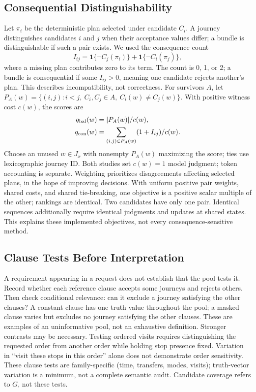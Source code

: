 \documentclass[a4paper,twoside]{article}
\begin{document}
\subsection{Consequential Distinguishability}

Let $\pi_i$ be the deterministic plan selected under candidate $C_i$. A journey distinguishes candidates $i$ and $j$ when their acceptance values differ; a bundle is distinguishable if such a pair exists. We used the consequence count
\begin{equation}
 I_{ij}=\mathbf{1}\{\neg C_j(\pi_i)\}
       +\mathbf{1}\{\neg C_i(\pi_j)\},
\end{equation}
where a missing plan contributes zero to its term. The count is 0, 1, or 2; a bundle is consequential if some $I_{ij}>0$, meaning one candidate rejects another's plan. This describes incompatibility, not correctness.
For survivors $A$, let $P_A(w)=\{(i,j):i<j,\ C_i,C_j\in A,\ C_i(w)\ne C_j(w)\}$. With positive witness cost $c(w)$, the scores are
\begin{equation}
\begin{split}
q_{\rm bal}(w)&=|P_A(w)|/c(w),\\
q_{\rm con}(w)&=\sum_{(i,j)\in P_A(w)}(1+I_{ij})/c(w).
\end{split}
\end{equation}
Choose an unused $w\in J_x$ with nonempty $P_A(w)$ maximizing the score; ties use lexicographic journey ID. Both studies set $c(w)=1$ model judgment; token accounting is separate. Weighting prioritizes disagreements affecting selected plans, in the hope of improving decisions. With uniform positive pair weights, shared costs, and shared tie-breaking, one objective is a positive scalar multiple of the other; rankings are identical. Two candidates have only one pair. Identical sequences additionally require identical judgments and updates at shared states. This explains these implemented objectives, not every consequence-sensitive method.



\subsection{Clause Tests Before Interpretation}

A requirement appearing in a request does not establish that the pool tests it. Record whether each reference clause accepts some journeys and rejects others. Then check conditional relevance: can it exclude a journey satisfying the other clauses? A constant clause has one truth value throughout the pool; a masked clause varies but excludes no journey satisfying the other clauses. These are examples of an uninformative pool, not an exhaustive definition.
Stronger contrasts may be necessary. Testing ordered visits requires distinguishing the requested order from another order while holding stop presence fixed. Variation in ``visit these stops in this order'' alone does not demonstrate order sensitivity. These clause tests are family-specific (time, transfers, modes, visits); truth-vector variation is a minimum, not a complete semantic audit. Candidate coverage refers to $G$, not these tests.
\end{document}
